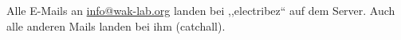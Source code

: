 Alle E-Mails an \url{info@wak-lab.org} landen bei ,,electribez`` auf dem Server. Auch alle anderen Mails landen bei ihm (catchall).\\
